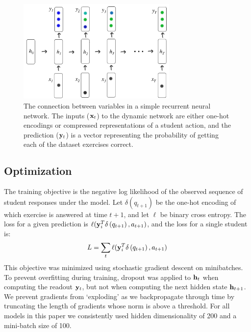 \begin{figure}[t]
\begin{center}
\includegraphics[width=0.7\textwidth]{img/rnn}
\end{center}
\caption[Recurrent neural network for knowledge tracing]{The connection between variables in a simple recurrent neural network. The inputs ($\mathbf x_t$) to the dynamic network are either one-hot encodings or compressed representations of a student action, and the prediction ($\mathbf y_t$) is a vector representing the probability of getting each of the dataset exercises correct.
\label{fig:rnn}
}

\end{figure}

\subsection{Optimization}

The training objective is the negative log likelihood of the observed sequence of student responses under the model. Let $\delta(q_{t+1})$ be the one-hot encoding of which exercise is answered at time $t+1$, and let $\ell$ be binary cross entropy. The loss for a given prediction is $\ell(\mathbf y_i^T \mathbf \delta\left(q_{t+1}\right), a_{t+1})$, and the loss for a single student is:
 \begin{equation}
   \begin{aligned}
         L = \sum_{t}\ell(\mathbf y_i^T \mathbf \delta\left(q_{t+1}\right), a_{t+1})
   \end{aligned}
 \end{equation}
This objective was minimized using stochastic gradient descent on minibatches.
To prevent overfitting during training, dropout was applied to $\mathbf h_t$ when computing the readout $\mathbf y_t$, but not when computing the next hidden state $\mathbf h_{t+1}$.
We prevent gradients from `exploding' as we backpropagate through time by truncating the length of gradients whose norm is above a threshold. For all models in this paper we consistently used hidden dimensionality of 200 and a mini-batch size of 100. 

